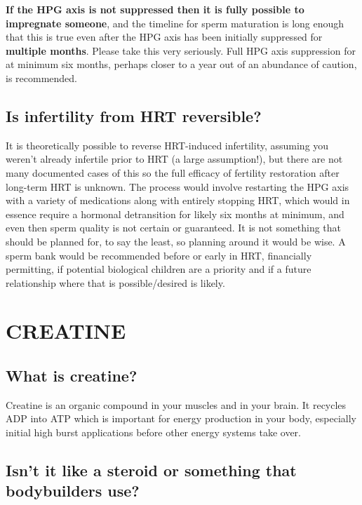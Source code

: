 \documentclass{article}
\begin{document}
\textbf{If the HPG axis is not suppressed then it is fully possible to impregnate someone}, and the timeline for sperm maturation is long enough that this is true even after the HPG axis has been initially suppressed for \textbf{multiple months}. Please take this very seriously. Full HPG axis suppression for at minimum six months, perhaps closer to a year out of an abundance of caution, is recommended.

\subsection{Is infertility from HRT reversible?}\label{11-43}

It is theoretically possible to reverse HRT-induced infertility, assuming you weren't already infertile prior to HRT (a large assumption!), but there are not many documented cases of this so the full efficacy of fertility restoration after long-term HRT is unknown. The process would involve restarting the HPG axis with a variety of medications along with entirely stopping HRT, which would in essence require a hormonal detransition for likely six months at minimum, and even then sperm quality is not certain or guaranteed. It is not something that should be planned for, to say the least, so planning around it would be wise. A sperm bank would be recommended before or early in HRT, financially permitting, if potential biological children are a priority and if a future relationship where that is possible/desired is likely.



\section{CREATINE}

\subsection{What is creatine?}

Creatine is an organic compound in your muscles and in your brain. It recycles ADP into ATP which is important for energy production in your body, especially initial high burst applications before other energy systems take over.

\subsection{Isn’t it like a steroid or something that bodybuilders use?}
\end{document}
